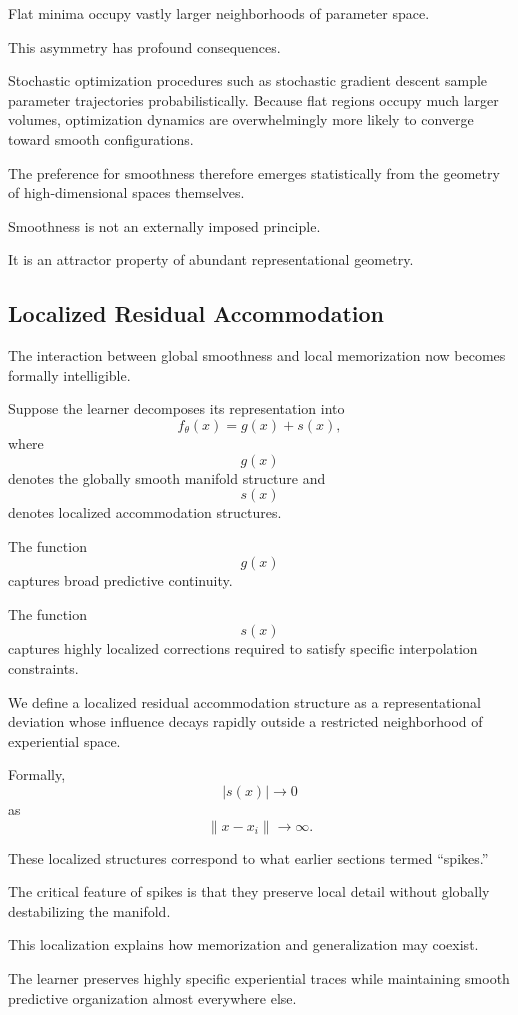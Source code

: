 \documentclass[12pt,a4paper]{article}
\begin{document}
Flat minima occupy vastly larger neighborhoods of parameter space.

This asymmetry has profound consequences.

Stochastic optimization procedures such as stochastic gradient descent sample parameter trajectories probabilistically. Because flat regions occupy much larger volumes, optimization dynamics are overwhelmingly more likely to converge toward smooth configurations.

The preference for smoothness therefore emerges statistically from the geometry of high-dimensional spaces themselves.

Smoothness is not an externally imposed principle.

It is an attractor property of abundant representational geometry.

\subsection{Localized Residual Accommodation}

The interaction between global smoothness and local memorization now becomes formally intelligible.

Suppose the learner decomposes its representation into
\[
f_\theta(x)
=
g(x)
+
s(x),
\]
where
\[
g(x)
\]
denotes the globally smooth manifold structure and
\[
s(x)
\]
denotes localized accommodation structures.

The function
\[
g(x)
\]
captures broad predictive continuity.

The function
\[
s(x)
\]
captures highly localized corrections required to satisfy specific interpolation constraints.

We define a localized residual accommodation structure as a representational deviation whose influence decays rapidly outside a restricted neighborhood of experiential space.

Formally,
\[
|s(x)| \to 0
\]
as
\[
\|x - x_i\| \to \infty.
\]

These localized structures correspond to what earlier sections termed ``spikes.''

The critical feature of spikes is that they preserve local detail without globally destabilizing the manifold.

This localization explains how memorization and generalization may coexist.

The learner preserves highly specific experiential traces while maintaining smooth predictive organization almost everywhere else.
\end{document}
